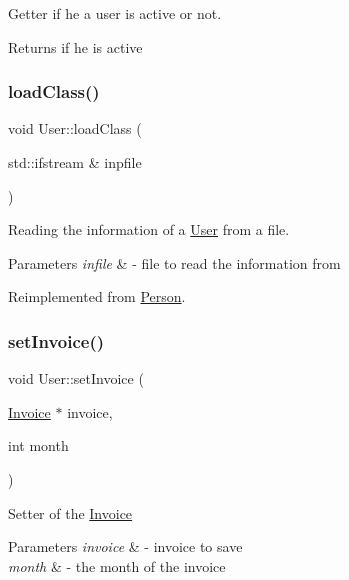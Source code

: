 Getter if he a user is active or not. 

\begin{DoxyReturn}{Returns}
if he is active 
\end{DoxyReturn}
\mbox{\label{class_user_abc12a9ca668bd860a3d6d2ae4791997d}} 
\subsubsection{\texorpdfstring{load\+Class()}{loadClass()}}
{\footnotesize\ttfamily void User\+::load\+Class (\begin{DoxyParamCaption}\item[{std\+::ifstream \&}]{inpfile }\end{DoxyParamCaption})\hspace{0.3cm}{\ttfamily [virtual]}}



Reading the information of a \mbox{\hyperlink{class_user}{User}} from a file. 


\begin{DoxyParams}{Parameters}
{\em infile} & -\/ file to read the information from \\
\hline
\end{DoxyParams}


Reimplemented from \mbox{\hyperlink{class_person_af07a032df8d56dddade4dc43960b536b}{Person}}.

\mbox{\label{class_user_ad0432b83c7379ca57ed782d2929f3b8a}} 
\subsubsection{\texorpdfstring{set\+Invoice()}{setInvoice()}}
{\footnotesize\ttfamily void User\+::set\+Invoice (\begin{DoxyParamCaption}\item[{\mbox{\hyperlink{class_invoice}{Invoice}} $\ast$}]{invoice,  }\item[{int}]{month }\end{DoxyParamCaption})}

Setter of the \mbox{\hyperlink{class_invoice}{Invoice}} 
\begin{DoxyParams}{Parameters}
{\em invoice} & -\/ invoice to save \\
\hline
{\em month} & -\/ the month of the invoice \\
\hline
\end{DoxyParams}
\mbox{\label{class_user_a0cdc359989bc67c3a135737cf1232a49}} 
